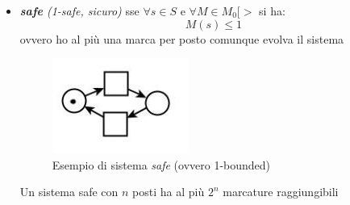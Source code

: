 \documentclass[a4paper,12pt, oneside]{book}
\begin{document}
\begin{definizione}
\begin{itemize}
    \item \textit{\textbf{safe} (1-safe, sicuro)} sse $\forall s\in S$ e
    $\forall M\in 
    M_0[>$ si ha:
    \[M(s)\leq 1\]
    ovvero ho al più una marca per posto comunque evolva il sistema  
    \begin{figure}[H]
      \centering
      \includegraphics[scale = 0.55]{img/ptc3.jpg}
      \caption{Esempio di sistema \emph{safe} (ovvero 1-bounded)}
    \end{figure}
    Un sistema safe con $n$ posti ha al più $2^n$ marcature raggiungibili
  \end{itemize}
\end{definizione}
\end{document}
